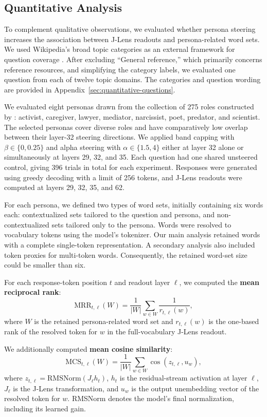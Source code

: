 \subsection{Quantitative Analysis}
\label{sec:quantitative-methods}
To complement qualitative observations, we evaluated whether persona steering increases the association between J-Lens readouts and persona-related word sets.
We used Wikipedia's broad topic categories as an external framework for question coverage \citep{wikipedia_categories}. After excluding ``General reference,'' which primarily concerns reference resources, and simplifying the category labels, we evaluated one question from each of twelve topic domains. The categories and question wording are provided in Appendix~\ref{sec:quantitative-questions}.

We evaluated eight personas drawn from the collection of 275 roles constructed by \citet{lu2026assistant}: activist, caregiver, lawyer, mediator, narcissist, poet, predator, and scientist. The selected personas cover diverse roles and have comparatively low overlap between their layer-32 steering directions.
We applied band capping with $\beta\in\{0,0.25\}$ and alpha steering with $\alpha\in\{1.5,4\}$ either at layer 32 alone or simultaneously at layers 29, 32, and 35. Each question had one shared unsteered control, giving 396 trials in total for each experiment. Responses were generated using greedy decoding with a limit of 256 tokens, and J-Lens readouts were computed at layers 29, 32, 35, and 62.

For each persona, we defined two types of word sets, initially containing six words each: contextualized sets tailored to the question and persona, and non-contextualized sets tailored only to the persona. Words were resolved to vocabulary tokens using the model's tokenizer. Our main analysis retained words with a complete single-token representation. A secondary analysis also included token proxies for multi-token words. Consequently, the retained word-set size could be smaller than six.

For each response-token position $t$ and readout layer $\ell$, we computed the \textbf{mean reciprocal rank}:
\[
\mathrm{MRR}_{t,\ell}(W)
=\frac{1}{|W|}\sum_{w\in W}\frac{1}{r_{t,\ell}(w)},
\]
where $W$ is the retained persona-related word set and $r_{t,\ell}(w)$ is the one-based rank of the resolved token for $w$ in the full-vocabulary J-Lens readout.

We additionally computed \textbf{mean cosine similarity}:
\[
\mathrm{MCS}_{t,\ell}(W)
=\frac{1}{|W|}\sum_{w\in W}
\cos\!\left(z_{t,\ell},u_w\right),
\]
where $z_{t,\ell}=\mathrm{RMSNorm}(J_\ell h_t)$, $h_t$ is the residual-stream activation at layer $\ell$, $J_\ell$ is the J-Lens transformation, and $u_w$ is the output unembedding vector of the resolved token for $w$. RMSNorm denotes the model's final normalization, including its learned gain.

